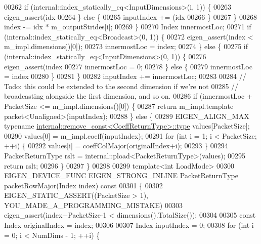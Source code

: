 \begin{DoxyCode}
00262         \textcolor{keywordflow}{if} (internal::index\_statically\_eq<InputDimensions>(i, 1)) \{
00263           eigen\_assert(idx %
00264         \} \textcolor{keywordflow}{else} \{
00265           inputIndex += (idx %
00266         \}
00267       \}
00268       index -= idx * m\_outputStrides[i];
00269     \}
00270     Index innermostLoc;
00271     \textcolor{keywordflow}{if} (internal::index\_statically\_eq<Broadcast>(0, 1)) \{
00272       eigen\_assert(index < m\_impl.dimensions()[0]);
00273       innermostLoc = index;
00274     \} \textcolor{keywordflow}{else} \{
00275       \textcolor{keywordflow}{if} (internal::index\_statically\_eq<InputDimensions>(0, 1)) \{
00276         eigen\_assert(index %
00277         innermostLoc = 0;
00278       \} \textcolor{keywordflow}{else} \{
00279         innermostLoc = index %
00280       \}
00281     \}
00282     inputIndex += innermostLoc;
00283 
00284     \textcolor{comment}{// Todo: this could be extended to the second dimension if we're not}
00285     \textcolor{comment}{// broadcasting alongside the first dimension, and so on.}
00286     \textcolor{keywordflow}{if} (innermostLoc + PacketSize <= m\_impl.dimensions()[0]) \{
00287       \textcolor{keywordflow}{return} m\_impl.template packet<Unaligned>(inputIndex);
00288     \} \textcolor{keywordflow}{else} \{
00289       EIGEN\_ALIGN\_MAX \textcolor{keyword}{typename} \hyperlink{group___sparse_core___module}{internal::remove\_const<CoeffReturnType>::type}
       values[PacketSize];
00290       values[0] = m\_impl.coeff(inputIndex);
00291       \textcolor{keywordflow}{for} (\textcolor{keywordtype}{int} i = 1; i < PacketSize; ++i) \{
00292         values[i] = coeffColMajor(originalIndex+i);
00293       \}
00294       PacketReturnType rslt = internal::pload<PacketReturnType>(values);
00295       \textcolor{keywordflow}{return} rslt;
00296     \}
00297   \}
00298 
00299   \textcolor{keyword}{template}<\textcolor{keywordtype}{int} LoadMode>
00300   EIGEN\_DEVICE\_FUNC EIGEN\_STRONG\_INLINE PacketReturnType packetRowMajor(Index index)\textcolor{keyword}{ const}
00301 \textcolor{keyword}{  }\{
00302     EIGEN\_STATIC\_ASSERT((PacketSize > 1), YOU\_MADE\_A\_PROGRAMMING\_MISTAKE)
00303     eigen\_assert(index+PacketSize-1 < dimensions().TotalSize());
00304 
00305     \textcolor{keyword}{const} Index originalIndex = index;
00306 
00307     Index inputIndex = 0;
00308     \textcolor{keywordflow}{for} (\textcolor{keywordtype}{int} i = 0; i < NumDims - 1; ++i) \{

\end{DoxyCode}

